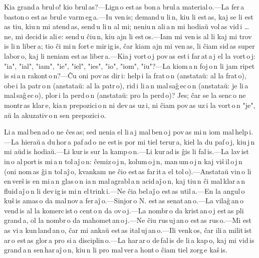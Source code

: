 
Kia grand\,a brul\,o! kio brul\,as?---Lign\,o est\,as bon\,a brul\,a material\,o.---La fer\,a baston\,o est\,as brul\,e varm\,eg\,a.---Iu ven\,is; demand\,u li\,n, kiu li est\,as, kaj se li est\,as tiu, kiu\,n mi atend\,as, send\,u li\,n al mi; neniu\,n ali\,a\,n mi hodiaŭ vol\,as vid\,i \ldots{} ne, mi decid\,is ali\,e: send\,u ĉiu\,n, kiu ajn li est\,os.---Iam mi ven\,is al li kaj mi trov\,is li\,n liber\,a; tio ĉi mi\,n fort\,e mir\,ig\,is, ĉar kiam ajn mi ven\,as, li ĉiam sid\,as super labor\,o, kaj li neniam est\,as liber\,a.---Kia\,j vort\,o\,j pov\,as est\,i far\,at\,a\,j el la vort\,o\,j: "ia", "ial", "iam", "ie", "iel", "ies", "io", "iom", "iu"?---La kiom\,a\,n foj\,o\,n li jam ripet\,is si\,a\,n rakont\,o\,n?---Ĉu oni pov\,as dir\,i: help\,i la frat\,o\,n (anstataŭ: al la frat\,o), obe\,i la patr\,o\,n (anstataŭ: al la patr\,o), rid\,i li\,a\,n mal\,saĝ\,ec\,o\,n (anstataŭ: je li\,a mal\,saĝ\,ec\,o), plor\,i la perd\,o\,n (anstataŭ: pro la perd\,o)? Jes; ĉar se la senc\,o ne montr\,as klar\,e, kia\,n prepozici\,o\,n ni dev\,as uz\,i, ni ĉiam pov\,as uz\,i la vort\,o\,n "je", aŭ la akuzativ\,o\,n sen prepozici\,o. 



Li\,a mal\,ben\,ad\,o ne ĉes\,as; sed nenia el li\,a\,j mal\,ben\,o\,j pov\,as mi\,n iom mal\,help\,i.---La hieraŭ\,a du\,hor\,a paf\,ad\,o ne est\,is por mi tiel terur\,a, kiel la du paf\,o\,j, kiu\,j\,n mi aŭd\,is hodiaŭ.---Li kur\,is sur la kamp\,o\,n.---Li kur\,ad\,is ĝis li fal\,is.---La lav\,ist\,in\,o al\,port\,is mi\,a\,n tol\,aĵ\,o\,n: ĉemiz\,o\,j\,n, kolum\,o\,j\,n, man\,um\,o\,j\,n kaj viŝ\,il\,o\,j\,n (oni nom\,as ĝi\,n tol\,aĵ\,o, kvankam ne ĉio est\,as far\,it\,a el tol\,o).---Anstataŭ vin\,o li en\,verŝ\,is en mi\,a\,n glas\,o\,n ia\,n mal\,agrabl\,a\,n acid\,aĵ\,o\,n, kaj tiu\,n ĉi mal\,klar\,a\,n fluid\,aĵ\,o\,n li dev\,ig\,is mi\,n el\,trink\,i.---Ne ĉia bel\,aĵ\,o est\,as util\,a.---En la angul\,o kuŝ\,is amas\,o da mal\,nov\,a fer\,aĵ\,o.---Sinjor\,o N. est\,as senat\,an\,o.---La vilaĝ\,an\,o vend\,is al la komerc\,ist\,o cent\,o\,n da ov\,o\,j.---La nombr\,o da krist\,an\,o\,j est\,as pli grand\,a, ol la nombr\,o da mahomet\,an\,o\,j.---Ne ĉiu rus\,uj\,an\,o est\,as rus\,o.---Mi est\,as vi\,a kun\,land\,an\,o, ĉar mi ankaŭ est\,as ital\,uj\,an\,o.---Ili venk\,os, ĉar ili\,a milit\,ist\,ar\,o est\,as glor\,a pro si\,a disciplin\,o.---La har\,ar\,o de\,fal\,is de li\,a kap\,o, kaj mi vid\,is grand\,a\,n sen\,har\,aĵ\,o\,n, kiu\,n li pro mal\,ver\,a hont\,o ĉiam tiel zorg\,e kaŝ\,is. 


